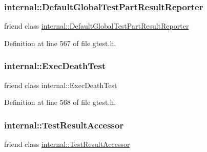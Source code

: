 \subsubsection{\texorpdfstring{internal\+::\+Default\+Global\+Test\+Part\+Result\+Reporter}{internal::DefaultGlobalTestPartResultReporter}}
{\footnotesize\ttfamily friend class \hyperlink{classtesting_1_1internal_1_1DefaultGlobalTestPartResultReporter}{internal\+::\+Default\+Global\+Test\+Part\+Result\+Reporter}\hspace{0.3cm}{\ttfamily [friend]}}



Definition at line 567 of file gtest.\+h.

\mbox{\label{classtesting_1_1TestResult_adf5553cae6aea6f8648d47e299237e34}} 
\subsubsection{\texorpdfstring{internal\+::\+Exec\+Death\+Test}{internal::ExecDeathTest}}
{\footnotesize\ttfamily friend class internal\+::\+Exec\+Death\+Test\hspace{0.3cm}{\ttfamily [friend]}}



Definition at line 568 of file gtest.\+h.

\mbox{\label{classtesting_1_1TestResult_ae762da04e74a0d3b0daded3c5bd4a8e8}} 
\subsubsection{\texorpdfstring{internal\+::\+Test\+Result\+Accessor}{internal::TestResultAccessor}}
{\footnotesize\ttfamily friend class \hyperlink{classtesting_1_1internal_1_1TestResultAccessor}{internal\+::\+Test\+Result\+Accessor}\hspace{0.3cm}{\ttfamily [friend]}}



